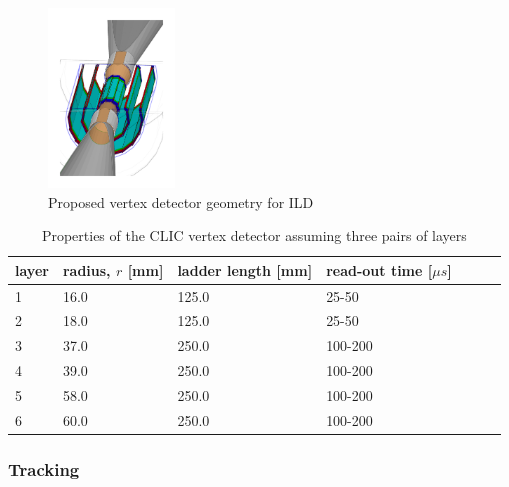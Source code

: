 \begin{figure}
  \centering
  \includegraphics[width=0.3\textwidth,keepaspectratio]{Experiments/fig/Vertex}
  \caption[ILD Vertex Detector]{Proposed vertex detector geometry for ILD \cite{ILD}}
  \label{fig:VTX}
\end{figure}

\begin{table}
  \caption{Properties of the CLIC vertex detector assuming three pairs of layers \cite{ILD}}
  \centering

  \begin{tabular}{l l l l l l l}
    \toprule
    layer           & radius, $r$ [mm]         & ladder length [mm]  & read-out time [$\mu s$]  \\
    \midrule
    1 & 16.0 & 125.0 & 25-50 \\
    2 & 18.0 & 125.0 & 25-50 \\
    3 & 37.0 & 250.0 & 100-200 \\
    4 & 39.0 & 250.0 & 100-200 \\
    5 & 58.0 & 250.0 & 100-200 \\
    6 & 60.0 & 250.0 & 100-200 \\
    \bottomrule
  \end{tabular}
  \label{tab:aVTX}

\end{table}


\subsubsection{Tracking}

